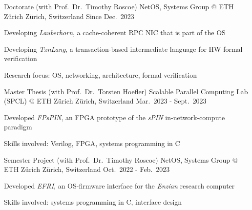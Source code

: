 
\begin{cventries}

  \cventry
    {Doctorate (with Prof.\ Dr.\ Timothy Roscoe)} %
    {NetOS, Systems Group @ ETH Z\"urich} %
    {Z\"urich, Switzerland} %
    {Since Dec.\ 2023} %
    {
        \begin{cvitems}
            \item {Developing \emph{Lauberhorn}, a cache-coherent RPC NIC
                that is part of the OS}
            \item {Developing \emph{TxnLang}, a transaction-based
                intermediate language for HW formal verification}
            \item {Research focus: OS, networking, architecture, formal
                verification}
        \end{cvitems}
    }

  \cventry
    {Master Thesis (with Prof.\ Dr.\ Torsten Hoefler)} %
    {Scalable Parallel Computing Lab (SPCL) @ ETH Z\"urich} %
    {Z\"urich, Switzerland} %
    {Mar.\ 2023 - Sept.\ 2023} %
    {
        \begin{cvitems}
            \item {Developed \emph{FPsPIN}, an FPGA prototype of the
                \emph{sPIN} in-network-compute paradigm}
            \item {Skills involved: Verilog, FPGA, systems programming in C}
        \end{cvitems}
    }

  \cventry
    {Semester Project (with Prof.\ Dr.\ Timothy Roscoe)} %
    {NetOS, Systems Group @ ETH Z\"urich} %
    {Z\"urich, Switzerland} %
    {Oct.\ 2022 - Feb.\ 2023} %
    {
        \begin{cvitems}
            \item {Developed \emph{EFRI}, an OS-firmware interface for the
                \emph{Enzian} research computer}
            \item {Skills involved: systems programming in C, interface design}
        \end{cvitems}
    }


\end{cventries}
